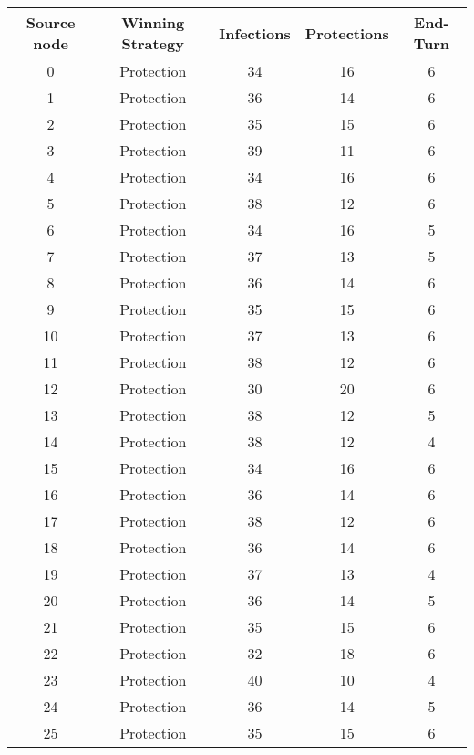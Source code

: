 \documentclass[results.tex]{subfiles}
\begin{document}
\begin{center}
  \begin{tabular}{| c || c | c | c | c |}
    \hline
    {\bfseries Source node} & {\bfseries Winning Strategy} & {\bfseries Infections} & {\bfseries Protections} & {\bfseries End-Turn} \\  %
    \hline\hline
    0 & Protection & 34 & 16 & 6 \\ 
    \hline
    1 & Protection & 36 & 14 & 6 \\ 
    \hline
    2 & Protection & 35 & 15 & 6 \\ 
    \hline
    3 & Protection & 39 & 11 & 6 \\ 
    \hline
    4 & Protection & 34 & 16 & 6 \\ 
    \hline
    5 & Protection & 38 & 12 & 6 \\ 
    \hline
    6 & Protection & 34 & 16 & 5 \\ 
    \hline
    7 & Protection & 37 & 13 & 5 \\ 
    \hline
    8 & Protection & 36 & 14 & 6 \\ 
    \hline
    9 & Protection & 35 & 15 & 6 \\ 
    \hline
    10 & Protection & 37 & 13 & 6 \\ 
    \hline
    11 & Protection & 38 & 12 & 6 \\ 
    \hline
    12 & Protection & 30 & 20 & 6 \\ 
    \hline
    13 & Protection & 38 & 12 & 5 \\ 
    \hline
    14 & Protection & 38 & 12 & 4 \\ 
    \hline
    15 & Protection & 34 & 16 & 6 \\ 
    \hline
    16 & Protection & 36 & 14 & 6 \\ 
    \hline
    17 & Protection & 38 & 12 & 6 \\ 
    \hline
    18 & Protection & 36 & 14 & 6 \\ 
    \hline
    19 & Protection & 37 & 13 & 4 \\ 
    \hline
    20 & Protection & 36 & 14 & 5 \\ 
    \hline
    21 & Protection & 35 & 15 & 6 \\ 
    \hline
    22 & Protection & 32 & 18 & 6 \\ 
    \hline
    23 & Protection & 40 & 10 & 4 \\ 
    \hline
    24 & Protection & 36 & 14 & 5 \\ 
    \hline
    25 & Protection & 35 & 15 & 6 \\ 

\end{tabular}
\end{center}
\end{document}
